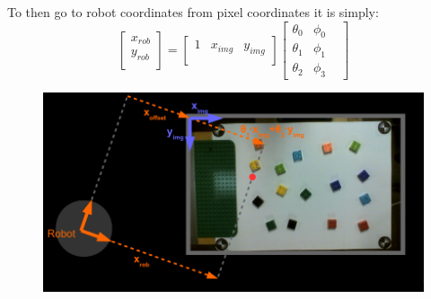 To then go to robot coordinates from pixel coordinates it is simply:
\begin{equation}
\begin{bmatrix}
x_{rob} \\
y_{rob} \\
\end{bmatrix} 
= 
\begin{bmatrix}
1 & x_{img} & y_{img}\\
\end{bmatrix} 
\begin{bmatrix}
\theta_0 & \phi_0 & \\
\theta_1 & \phi_1 & \\
\theta_2 & \phi_3 &  
\end{bmatrix}  
\end{equation}

\begin{figure}[h]
\centering
\includegraphics[width=\textwidth]{figures/camera_robot_shortcut.png}
\caption{}
\label{fig:camera_robot_shortcut}
\end{figure}
